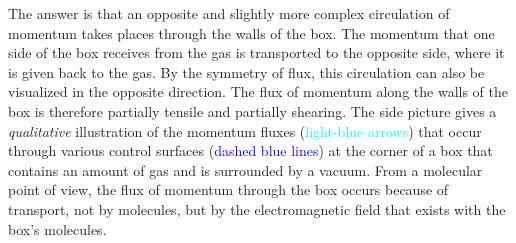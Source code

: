 \documentclass[a4paper,12pt,%
onecolumn,oneside,%
british%
]{memoir}
\renewcommand*{\|}[1][]{\nonscript\:#1\vert\nonscript\:\mathopen{}}
\begin{document}
The answer is that an opposite and slightly more complex circulation of momentum takes places through the walls of the box. The momentum that one side of the box receives from the gas is transported to the opposite side, where it is given back to the gas. By the symmetry of flux, this circulation can also be visualized in the opposite direction. The flux of momentum along the walls of the box is therefore partially tensile and partially shearing. The side picture gives a \emph{qualitative} illustration of the momentum fluxes (\textcolor{cyan}{light-blue arrows}) that occur through various control surfaces (\textcolor{blue}{dashed blue lines}) at the corner of a box that contains an amount of gas and is surrounded by a vacuum. From a molecular point of view, the flux of momentum through the box occurs because of transport, not by molecules, but by the electromagnetic field that exists with the box's molecules.
%
%
\end{document}

